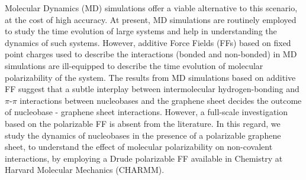 Molecular Dynamics (MD) simulations offer a viable alternative to this scenario, at the cost of high accuracy. At present, MD simulations are routinely employed to study the time evolution of large systems and help in understanding the dynamics of such systems. However, additive Force Fields (FFs) based on fixed point charges used to describe the interactions (bonded and non-bonded) in MD simulations are ill-equipped to describe the time evolution of molecular polarizability of the system. The results from MD simulations based on additive FF suggest that a subtle interplay between intermolecular hydrogen-bonding and $\pi$-$\pi$ interactions between nucleobases and the graphene sheet decides the outcome of nucleobase - graphene sheet interactions.\supercite{saikia_hierarchical_2017, saikia_dynamics_2018, ortmann_attracted_2005} However, a full-scale investigation based on the polarizable FF is absent from the literature. In this regard, we study the dynamics of nucleobases in the presence of a polarizable graphene sheet, to understand the effect of molecular polarizability on non-covalent interactions, by employing a Drude polarizable FF available in Chemistry at Harvard Molecular Mechanics (CHARMM).
